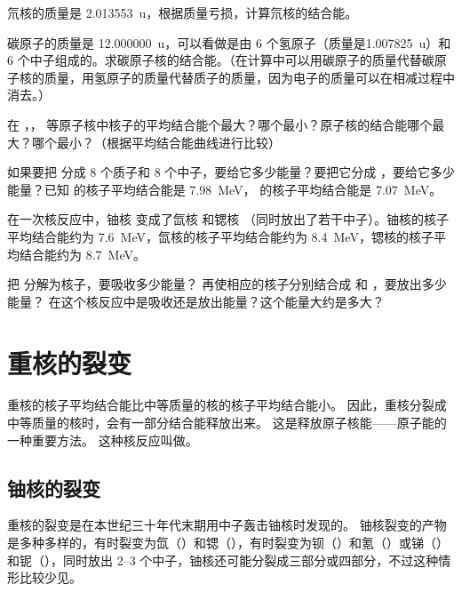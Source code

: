\begin{Practice}
\begin{question}
  \item 氘核的质量是 \qty{2.013553}{u}，根据质量亏损，计算氘核的结合能。
  \item 碳原子的质量是 \qty{12.000000}{u}，可以看做是由 6 个氢原子（质量是\qty{1.007825}{u}）和 6 个中子组成的。求碳原子核的结合能。（在计算中可以用碳原子的质量代替碳原子核的质量，用氢原子的质量代替质子的质量，因为电子的质量可以在相减过程中消去。）
  \item  在 ，， 等原子核中核子的平均结合能个最大？哪个最小？原子核的结合能哪个最大？哪个最小？（根据平均结合能曲线进行比较）
  \item 如果要把  分成 8 个质子和 8 个中子，要给它多少能量？要把它分成 ，要给它多少能量？已知   的核子平均结合能是 \qty{7.98}{MeV}， 的核子平均结合能是 \qty{7.07}{MeV}。
  \item 在一次核反应中，铀核  变成了氙核  和锶核 （同时放出了若干中子）。铀核的核子平均结合能约为 \qty{7.6}{MeV}，氙核的核子平均结合能约为 \qty{8.4}{MeV}，锶核的核子平均结合能约为 \qty{8.7}{MeV}。
  \begin{tasks}
    \task 把  分解为核子，要吸收多少能量？
    \task 再使相应的核子分别结合成  和 ，要放出多少能量？
    \task 在这个核反应中是吸收还是放出能量？这个能量大约是多大？
  \end{tasks}
\end{question}
\end{Practice}


\section{重核的裂变}
重核的核子平均结合能比中等质量的核的核子平均结合能小。
因此，重核分裂成中等质量的核时，会有一部分结合能释放出来。
这是释放原子核能——原子能的一种重要方法。
这种核反应叫做。

\subsection{铀核的裂变}
重核的裂变是在本世纪三十年代末期用中子轰击铀核时发现的。
铀核裂变的产物是多种多样的，有时裂变为氙（）和锶（），有时裂变为钡（）和氪（）或锑（）和铌（），同时放出 \numrange{2}{3} 个中子，铀核还可能分裂成三部分或四部分，不过这种情形比较少见。

